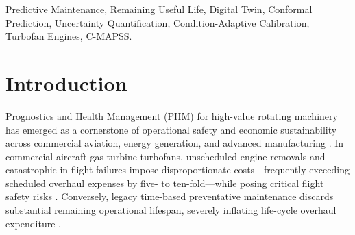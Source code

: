 \documentclass[conference,a4paper]{IEEEtran}
\begin{document}
\begin{IEEEkeywords}
Predictive Maintenance, Remaining Useful Life, Digital Twin, Conformal Prediction, Uncertainty Quantification, Condition-Adaptive Calibration, Turbofan Engines, C-MAPSS.
\end{IEEEkeywords}

\section{Introduction}

Prognostics and Health Management (PHM) for high-value rotating machinery has emerged as a cornerstone of operational safety and economic sustainability across commercial aviation, energy generation, and advanced manufacturing \cite{saxena2008damage, diana2025ai}. In commercial aircraft gas turbine turbofans, unscheduled engine removals and catastrophic in-flight failures impose disproportionate costs---frequently exceeding scheduled overhaul expenses by five- to ten-fold---while posing critical flight safety risks \cite{shehadeh2024evaluating, hosseinzadeh2023predictive}. Conversely, legacy time-based preventative maintenance discards substantial remaining operational lifespan, severely inflating life-cycle overhaul expenditure \cite{bello2024ai, brighenti2024forecasting}.
\end{document}
